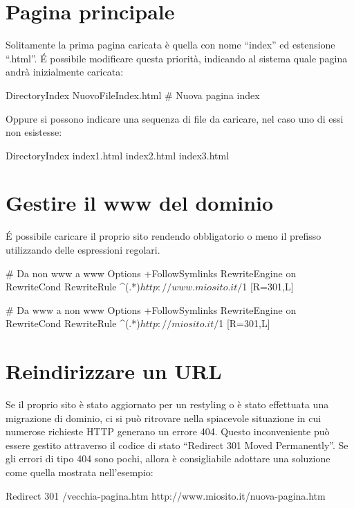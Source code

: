 \section*{Pagina principale}
Solitamente la prima pagina caricata è quella con nome ``index'' ed estensione ``.html''. \'E possibile modificare questa priorità, indicando al sistema quale pagina andrà inizialmente caricata:

\begin{code}
DirectoryIndex NuovoFileIndex.html # Nuova pagina index
\end{code}

Oppure si possono indicare una sequenza di file da caricare, nel caso uno di essi non esistesse:

\begin{code}
DirectoryIndex index1.html index2.html index3.html 
\end{code}

\section*{Gestire il www del dominio}
\'E possibile caricare il proprio sito rendendo obbligatorio o meno il prefisso  utilizzando delle espressioni regolari.

\begin{code}
# Da non www a www
Options +FollowSymlinks
RewriteEngine on
RewriteCond %
RewriteRule ^(.*)$ http://www.miosito.it/$1 [R=301,L]
\end{code}

\begin{code}
# Da www a non www
Options +FollowSymlinks
RewriteEngine on
RewriteCond %
RewriteRule ^(.*)$ http://miosito.it/$1 [R=301,L]
\end{code}

\section*{Reindirizzare un URL}
Se il proprio sito è stato aggiornato per un restyling o è stato effettuata una migrazione di dominio, ci si può ritrovare nella spiacevole situazione in cui numerose richieste \ac{HTTP} generano un errore 404. Questo inconveniente può essere gestito attraverso il codice di stato ``Redirect 301 Moved Permanently''. Se gli errori di tipo 404 sono pochi, allora è consigliabile adottare una soluzione come quella mostrata nell'esempio:

\begin{code}
Redirect 301 /vecchia-pagina.htm http://www.miosito.it/nuova-pagina.htm
\end{code}

